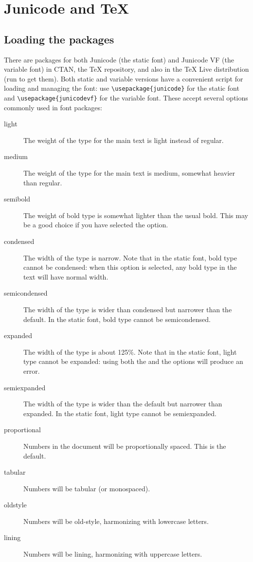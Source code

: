 \chapter{Junicode and {\TeX}}\hypertarget{JunicodeAndTeX}{}

\section{Loading the packages}

There are packages for both Junicode (the static font) and Junicode VF (the variable font) 
in CTAN, the {\TeX} repository, and also
in the {\TeX} Live distribution (run  to get them). Both static and variable versions
have a convenient script for loading and managing the font: use
{\color{BrickRed}\verb|\usepackage{junicode}|} for the static font and
{\color{BrickRed}\verb|\usepackage{junicodevf}|} for the variable font. These accept several
options commonly used in font packages:

\begin{description}
    \item[light] The weight of the type for the main text is light instead of regular.
    \item[medium] The weight of the type for the main text is medium, somewhat heavier than regular.
    \item[semibold] The weight of bold type is somewhat lighter than the usual bold. This may be a
    good choice if you have selected the  option.
    \item[condensed] The width of the type is narrow. Note that in the static font,
    bold type cannot be condensed: when
    this option is selected, any bold type in the text will have normal width.
    \item[semicondensed] The width of the type is wider than condensed but narrower than the default.
    In the static font, bold type cannot be semicondensed.
    \item[expanded] The width of the type is about 125\%. Note that in the static font, light type
    cannot be expanded: using both the  and the  options will produce
    an error.
    \item[semiexpanded] The width of the type is wider than the default but narrower than expanded.
    In the static font, light type cannot be semiexpanded.
    \item[proportional] Numbers in the document will be proportionally spaced. This is the default.
    \item[tabular] Numbers will be tabular (or monospaced).
    \item[oldstyle] Numbers will be old-style, harmonizing with lowercase letters.
    \item[lining] Numbers will be lining, harmonizing with uppercase letters.
\end{description}

